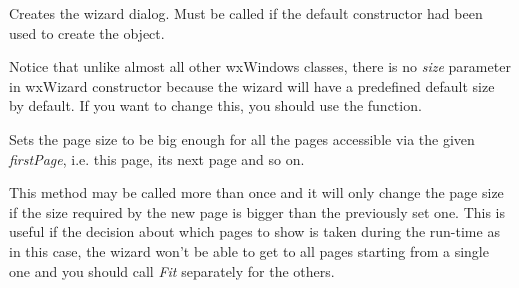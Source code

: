 
\label{wxwizardcreate}


Creates the wizard dialog. Must be called if the default constructor had been
used to create the object.

Notice that unlike almost all other wxWindows classes, there is no {\it size} 
parameter in wxWizard constructor because the wizard will have a predefined
default size by default. If you want to change this, you should use the 
 function.







\label{wxwizardfittopage}


Sets the page size to be big enough for all the pages accessible via the
given {\it firstPage}, i.e. this page, its next page and so on.

This method may be called more than once and it will only change the page size
if the size required by the new page is bigger than the previously set one.
This is useful if the decision about which pages to show is taken during the
run-time as in this case, the wizard won't be able to get to all pages starting
from a single one and you should call {\it Fit} separately for the others.

\label{wxwizardgetcurrentpage}


